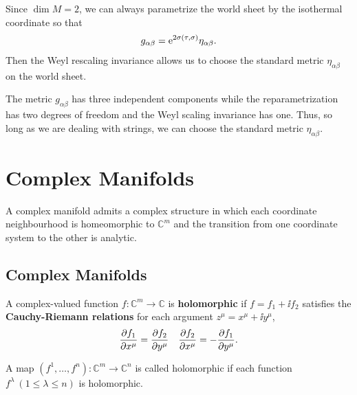 \documentclass[10pt]{article}
\begin{document}
\begin{remark}
    Since $\dim M=2$, we can always parametrize the world sheet by the isothermal coordinate so that
    \begin{align}
        g_{\alpha\beta}=\mathrm{e}^{2\sigma(\tau,\sigma)}\eta_{\alpha\beta}.
    \end{align}
    Then the Weyl rescaling invariance allows us to choose the standard metric $\eta_{\alpha\beta}$ on the world sheet.

    The metric $g_{\alpha\beta}$ has three independent components while the reparametrization has two degrees of freedom and the Weyl scaling invariance has one.
    Thus, so long as we are dealing with strings, we can choose the standard metric $\eta_{\alpha\beta}$.
\end{remark}
\clearpage

\section{Complex Manifolds}
\begin{intu}
    A complex manifold admits a complex structure in which each coordinate neighbourhood is homeomorphic to $\mathbb{C}^m$ and the transition from one coordinate system to the other is analytic.
\end{intu}

\subsection{Complex Manifolds}
\begin{definition}
    A complex-valued function $f:\mathbb{C}^m\to\mathbb{C}$ is \textbf{holomorphic} if $f=f_1+\ii f_2$ satisfies the \textbf{Cauchy-Riemann relations} for each argument $z^\mu=x^\mu+\ii y^\mu$,
    \begin{align}
        \pdv{f_1}{x^\mu}=\pdv{f_2}{y^\mu}\quad\pdv{f_2}{x^\mu}=-\pdv{f_1}{y^\mu}.
    \end{align}
\end{definition}
A map $(f^1,\dots,f^n):\mathbb{C}^m\to\mathbb{C}^n$ is called holomorphic if each function $f^\lambda\ (1\leq\lambda\leq n)$ is holomorphic.
\end{document}
